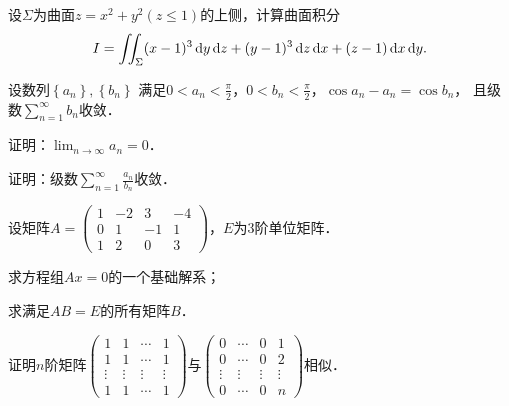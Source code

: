 \documentclass[plain,noanswer,medmath]{../../template/jnuexam}
\begin{document}
\begin{problem}[points=10]
设$\Sigma$为曲面$z = x^2 + y^2$$(z \le 1)$的上侧，计算曲面积分
$$I = \iint_{\Sigma}(x - 1)^3 \mathop{}\!\mathrm{d} y\mathop{}\!\mathrm{d} z + (y - 1)^3 \mathop{}\!\mathrm{d} z\mathop{}\!\mathrm{d} x + (z - 1)\mathop{}\!\mathrm{d} x\mathop{}\!\mathrm{d} y.$$
\end{problem}


\begin{problem}[points=10]
设数列$\left\{a_n \right\},\left\{b_n \right\}$
满足$0 < a_n < \frac{\pi}{2}$，$0 < b_n < \frac{\pi}{2}$，$\cos a_n - a_n = \cos b_n$，
且级数$\sum_{n = 1}^{\infty}b_n$收敛．
\begin{enumerate*}
\item 证明：$\lim_{n \to \infty} a_n = 0$．
\item 证明：级数$\sum_{n = 1}^{\infty}\frac{a_n}{b_n}$收敛．
\end{enumerate*}
\end{problem}


\begin{problem}[points=11]
设矩阵$A = \begin{pmatrix}
  1 & -2 &  3 & -4 \\
  0 &  1 & -1 & 1 \\
  1 &  2 &  0 & 3
\end{pmatrix}$，$E$为$3$阶单位矩阵．\par
\begin{enumerate*}
\item 求方程组$Ax = 0$的一个基础解系；
\item 求满足$AB = E$的所有矩阵$B$．
\end{enumerate*}
\end{problem}


\begin{problem}[points=11]
证明$n$阶矩阵$\begin{pmatrix}
       1 &      1 & \cdots & 1 \\
       1 &      1 & \cdots & 1 \\
  \vdots & \vdots & \vdots & \vdots \\
       1 &      1 & \cdots & 1
\end{pmatrix}$与$\begin{pmatrix}
       0 & \cdots &      0 & 1 \\
       0 & \cdots &      0 & 2 \\
  \vdots & \vdots & \vdots & \vdots \\
       0 & \cdots &      0 & n
\end{pmatrix}$相似．
\end{problem}
\end{document}
